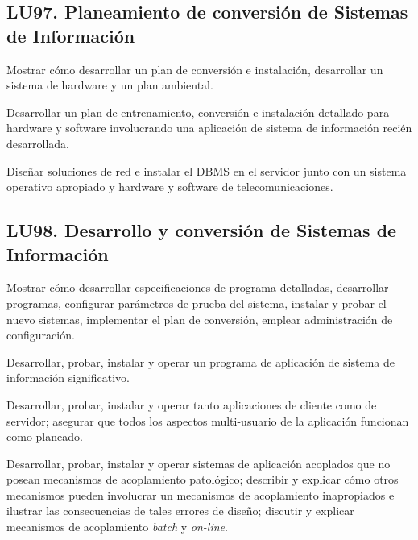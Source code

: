 \subsection{LU97. Planeamiento de conversión de Sistemas de Información}\label{sec:BOK-LU97}\label{sec:LU97}
\begin{LearningUnit}
\begin{LUGoal}
\item Mostrar cómo desarrollar un plan de conversión e instalación, desarrollar un sistema de hardware y un plan ambiental.
\end{LUGoal}

\begin{LUObjective}
\item Desarrollar un plan de entrenamiento, conversión e instalación detallado para hardware y software involucrando una aplicación de sistema de información recién desarrollada.
\item Diseñar soluciones de red e instalar el DBMS en el servidor junto con un sistema operativo apropiado y hardware y software de telecomunicaciones.
\end{LUObjective}
\end{LearningUnit}

\subsection{LU98. Desarrollo y conversión de Sistemas de Información}\label{sec:BOK-LU98}\label{sec:LU98}
\begin{LearningUnit}
\begin{LUGoal}
\item Mostrar cómo desarrollar especificaciones de programa detalladas, desarrollar programas, configurar parámetros de prueba del sistema, instalar y probar el nuevo sistemas, implementar el plan de conversión, emplear administración de configuración.
\end{LUGoal}

\begin{LUObjective}
\item Desarrollar, probar, instalar y operar un programa de aplicación de sistema de información significativo.
\item Desarrollar, probar, instalar y operar tanto aplicaciones de cliente como de servidor; asegurar que todos los aspectos multi-usuario de la aplicación funcionan como planeado.
\item Desarrollar, probar, instalar y operar sistemas de aplicación acoplados que no posean mecanismos de acoplamiento patológico; describir y explicar cómo otros mecanismos pueden involucrar un mecanismos de acoplamiento inapropiados e ilustrar las consecuencias de tales errores de diseño; discutir y explicar mecanismos de acoplamiento \textit{batch} y \textit{on-line}.
\end{LUObjective}
\end{LearningUnit}

